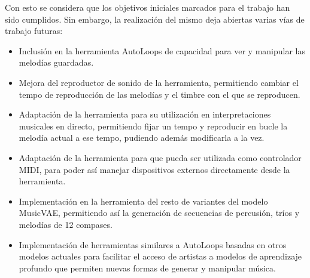 Con esto se considera que los objetivos iniciales marcados para el trabajo han sido cumplidos. Sin embargo, la realización del mismo deja abiertas varias vías de trabajo futuras:

\begin{itemize}
\item Inclusión en la herramienta AutoLoops de capacidad para ver y manipular las melodías guardadas.
\item Mejora del reproductor de sonido de la herramienta, permitiendo cambiar el tempo de reproducción de las melodías y el timbre con el que se reproducen.
\item Adaptación de la herramienta para su utilización en interpretaciones musicales en directo, permitiendo fijar un tempo y reproducir en bucle la melodía actual a ese tempo, pudiendo además modificarla a la vez.
\item Adaptación de la herramienta para que pueda ser utilizada como controlador MIDI, para poder así manejar dispositivos  externos directamente desde la herramienta.
\item Implementación en la herramienta del resto de variantes del modelo MusicVAE, permitiendo así la generación de secuencias de percusión, tríos y melodías de 12 compases.
\item Implementación de herramientas similares a AutoLoops basadas en otros modelos actuales para facilitar el acceso de artistas a modelos de aprendizaje profundo que permiten nuevas formas de generar y manipular música.
\end{itemize}

\endinput
